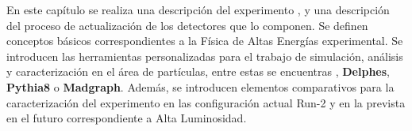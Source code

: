 %

En este capítulo se realiza una descripción del experimento \CMS, y una descripción del proceso de actualización de los detectores que lo componen. Se definen conceptos básicos correspondientes a la Física de Altas Energías experimental. Se introducen las herramientas personalizadas para el trabajo de simulación, análisis y caracterización en el área de partículas, entre estas se encuentras \ROOT, \textbf{Delphes}, \textbf{Pythia8} o \textbf{Madgraph}. Además, se introducen elementos comparativos para la caracterización del experimento en las configuración actual Run-2 y en la prevista en el futuro correspondiente a Alta Luminosidad.





